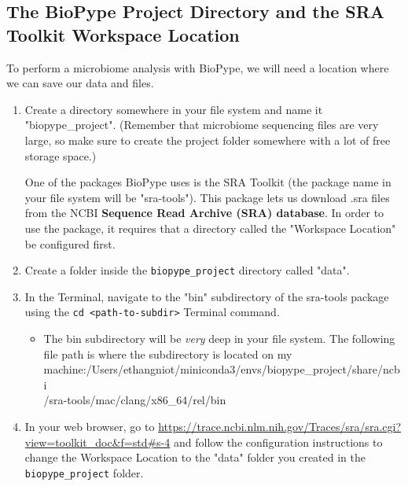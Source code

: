 %
\subsection{The BioPype Project Directory and the SRA Toolkit Workspace Location}
To perform a microbiome analysis with BioPype, we will need a location where we can save our data and files. 
\begin{enumerate}

\item {} Create a directory somewhere in your file system and name it \newline "biopype\_project". (Remember that microbiome sequencing files are very large, so make sure to create the project folder somewhere with a lot of free storage space.) 

One of the packages BioPype uses is the SRA Toolkit (the package name in your file system will be "sra-tools"). This package lets us download .sra files from the NCBI \textbf{Sequence Read Archive (SRA) database}. In order to use the package, it requires that a directory called the "Workspace Location" be configured first. 

\item Create a folder inside the \verb|biopype_project| directory called "data".
\item In the Terminal, navigate to the "bin" subdirectory of the sra-tools package using the \verb|cd <path-to-subdir>| Terminal command.
\begin{itemize}
\item The bin subdirectory will be \textit{very} deep in your file system. The following file path is where the subdirectory is located on my machine:\newline /Users/ethangniot/miniconda3/envs/biopype\_project/share/ncbi\\/sra-tools/mac/clang/x86\_64/rel/bin
\end{itemize}

\item In your web browser, go to \url{https://trace.ncbi.nlm.nih.gov/Traces/sra/sra.cgi?view=toolkit_doc&f=std#s-4} and follow the configuration instructions to change the Workspace Location to the "data" folder you created in the \verb|biopype_project| folder.


\end{enumerate}
